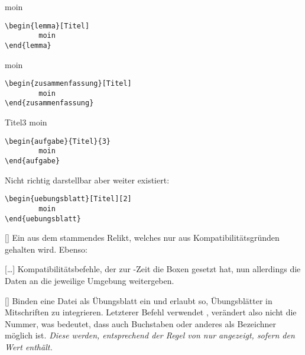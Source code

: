 \begingroup\begin{lemma}[Titel]
moin
\begin{lstlisting}[language=lLatex]
\begin{lemma}[Titel]
        moin
\end{lemma}\end{lstlisting}
\end{lemma}\endgroup

\begingroup\begin{zusammenfassung}[Titel]
moin
\begin{lstlisting}[language=lLatex]
\begin{zusammenfassung}[Titel]
        moin
\end{zusammenfassung}\end{lstlisting}
\end{zusammenfassung}\endgroup

\begingroup\begin{aufgabe}{Titel}{3}
moin
\begin{lstlisting}[language=lLatex]
\begin{aufgabe}{Titel}{3}
        moin
\end{aufgabe}\end{lstlisting}
\end{aufgabe}\endgroup

Nicht richtig darstellbar aber weiter existiert:
\begin{lstlisting}[language=lLatex]
\begin{uebungsblatt}[Titel][2]
        moin
\end{uebungsblatt}\end{lstlisting}

[\cmdold]
Ein aus dem  stammendes Relikt, welches nur aus Kompatibilitätsgründen gehalten wird. Ebenso:

[\cmdlist {}\cmdlist \ldots\cmdold]
Kompatibilitätsbefehle, der zur -Zeit die Boxen gesetzt hat, nun allerdings die Daten an die jeweilige Umgebung weitergeben.

[\cmdlist {}]
Binden eine Datei als Übungsblatt ein und erlaubt so, Übungsblätter in Mitschriften zu integrieren. Letzterer Befehl verwendet , verändert also nicht die Nummer, was bedeutet, dass auch Buchstaben oder anderes als Bezeichner möglich ist. \emph{Diese werden, entsprechend der Regel von  nur angezeigt, sofern  den Wert \T{\true} enthält.}



